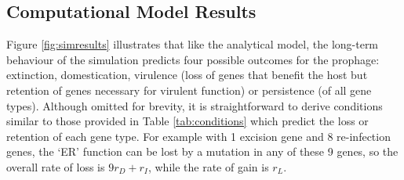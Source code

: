 \subsection{Computational Model Results}
 Figure \ref{fig:simresults} illustrates that like the analytical model, the long-term behaviour of the simulation predicts four possible outcomes for the prophage: extinction, domestication, virulence (loss of genes that benefit the host but retention of genes necessary for virulent function) or persistence (of all gene types).  Although omitted for brevity, it is straightforward to derive conditions similar to those provided in Table \ref{tab:conditions} which predict the loss or retention of each gene type.  For example with 1 excision gene and 8 re-infection genes, the `ER' function can be lost by a mutation in any of these 9 genes, so the overall rate of loss is $9r_D + r_I$, while the rate of gain is $r_L$.
